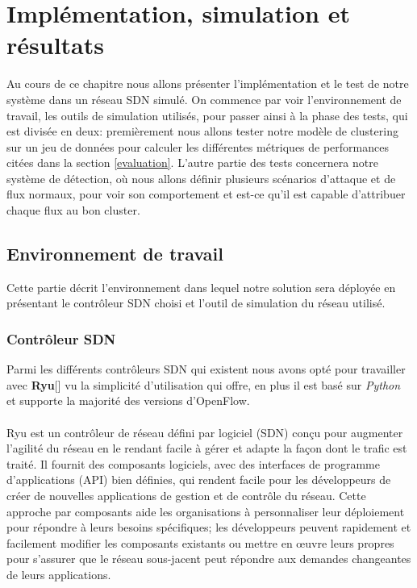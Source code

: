 \chapter{Implémentation, simulation et résultats}

\label{Chapter5}
Au cours de ce chapitre nous allons présenter l'implémentation et le test de notre système dans un réseau SDN simulé. On commence par voir l'environnement de travail, les outils de simulation utilisés, pour passer ainsi à la phase des tests, qui est divisée en deux: premièrement nous allons tester notre modèle de clustering sur un jeu de données pour calculer les différentes métriques de performances citées dans la section \ref{evaluation}. L'autre partie des tests concernera notre système de détection, où nous allons définir plusieurs scénarios d'attaque et de flux normaux, pour voir son comportement et est-ce qu'il est capable d'attribuer chaque flux au bon cluster. 


\section{Environnement de travail}
Cette partie décrit l'environnement dans lequel notre solution sera déployée en présentant le contrôleur SDN choisi et l'outil de simulation du réseau utilisé.

\subsection{Contrôleur SDN}
Parmi les différents contrôleurs SDN qui existent nous avons opté pour travailler avec \textbf{Ryu}[\cite{4}] vu la simplicité d'utilisation qui offre, en plus il est basé sur \textit{Python} et supporte la majorité des versions d’OpenFlow. \\\\
Ryu est un contrôleur de réseau défini par logiciel (SDN) conçu pour augmenter l’agilité du réseau en le rendant facile à gérer et adapte la façon dont le trafic est traité. Il fournit des composants logiciels, avec des interfaces de programme d'applications (API) bien définies, qui rendent facile pour les développeurs de créer de nouvelles applications de gestion et de contrôle du réseau. Cette approche par composants aide les organisations à personnaliser leur déploiement pour répondre à leurs besoins spécifiques; les développeurs peuvent rapidement et facilement modifier les composants existants ou mettre en œuvre leurs propres pour s’assurer que le réseau sous-jacent peut répondre aux demandes changeantes de leurs applications.\\

